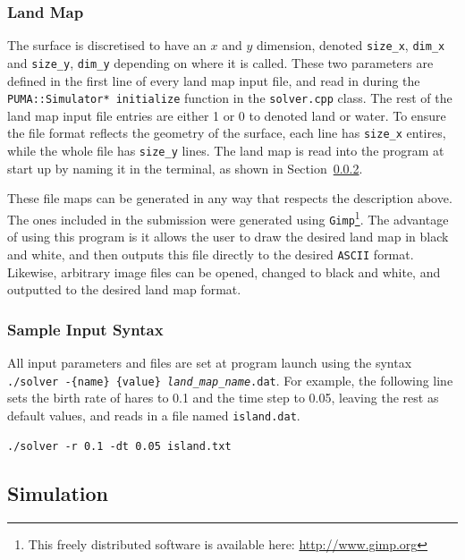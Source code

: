 \documentclass[a4paper,11pt]{article}
\begin{document}
{%

\subsubsection{Land Map}

The surface is discretised to have an $x$ and $y$ dimension, denoted \texttt{size\_x}, \texttt{dim\_x} and \texttt{size\_y}, \texttt{dim\_y} depending on where it is called.  These two parameters are defined in the first line of every land map input file, and read in during the \texttt{ PUMA::Simulator* initialize} function in the \texttt{solver.cpp} class.  The rest of the land map input file entries are either 1 or 0 to denoted land or water.  To ensure the file format reflects the geometry of the surface, each line has \texttt{size\_x} entires, while the whole file has \texttt{size\_y} lines. The land map is read into the program at start up by naming it in the terminal, as shown in Section~\ref{syntax}.

These file maps can be generated in any way that respects the description above.  The ones included in the submission were generated using \texttt{Gimp}\footnote{This freely distributed software is available here: \url{http://www.gimp.org}}.  The advantage of using this program is it allows the user to draw the desired land map in black and white, and then outputs this file directly to the desired \texttt{ASCII} format.  Likewise, arbitrary image files can be opened, changed to black and white, and outputted to the desired land map format.

  

\subsubsection{Sample Input Syntax}\label{syntax}

All input parameters and files are set at program launch using the syntax \texttt{./solver -\{name\} \{value\} \emph{land\_map\_name}.dat}.  For example, the following line sets the birth rate of hares to 0.1 and the time step to 0.05, leaving the rest as default values, and reads in a file named \texttt{island.dat}.

\vspace{5pt}
\noindent\texttt{./solver -r 0.1 -dt 0.05 island.txt}

\subsection{Simulation}

}
\end{document}
